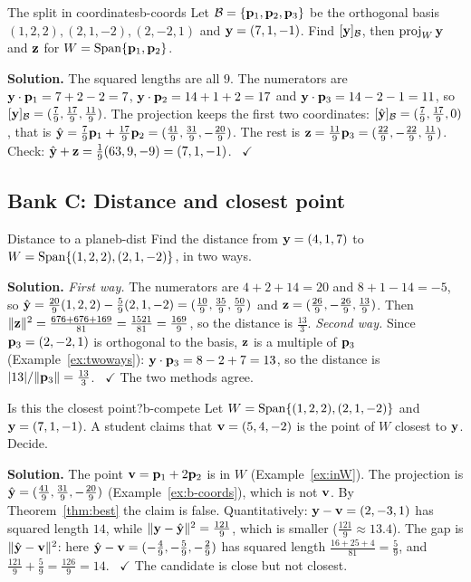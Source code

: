 \documentclass[11pt]{article}
\begin{document}
\begin{exmp}{The split in coordinates}{b-coords}
Let $\mathcal{B}=\{\mathbf{p}_1,\mathbf{p}_2,\mathbf{p}_3\}$ be the orthogonal basis $(1,2,2),(2,1,-2),(2,-2,1)$ and $\mathbf{y}=(7,1,-1)$. Find $[\mathbf{y}]_{\mathcal{B}}$, then $\operatorname{proj}_W\mathbf{y}$ and $\mathbf{z}$ for $W=\operatorname{Span}\{\mathbf{p}_1,\mathbf{p}_2\}$.

\textbf{Solution.} The squared lengths are all $9$. The numerators are $\mathbf{y}\cdot\mathbf{p}_1=7+2-2=7$, $\mathbf{y}\cdot\mathbf{p}_2=14+1+2=17$ and $\mathbf{y}\cdot\mathbf{p}_3=14-2-1=11$, so $[\mathbf{y}]_{\mathcal{B}}=(\tfrac79,\tfrac{17}9,\tfrac{11}9)$. The projection keeps the first two coordinates: $[\hat{\mathbf{y}}]_{\mathcal{B}}=(\tfrac79,\tfrac{17}9,0)$, that is $\hat{\mathbf{y}}=\tfrac79\mathbf{p}_1+\tfrac{17}9\mathbf{p}_2=(\tfrac{41}9,\tfrac{31}9,-\tfrac{20}9)$. The rest is $\mathbf{z}=\tfrac{11}9\mathbf{p}_3=(\tfrac{22}9,-\tfrac{22}9,\tfrac{11}9)$. Check: $\hat{\mathbf{y}}+\mathbf{z}=\tfrac19(63,9,-9)=(7,1,-1)$. \ $\checkmark$
\end{exmp}

\subsection*{Bank C: Distance and closest point}
\begin{exmp}{Distance to a plane}{b-dist}
Find the distance from $\mathbf{y}=(4,1,7)$ to $W=\operatorname{Span}\{(1,2,2),(2,1,-2)\}$, in two ways.

\textbf{Solution.} \emph{First way.} The numerators are $4+2+14=20$ and $8+1-14=-5$, so $\hat{\mathbf{y}}=\tfrac{20}9(1,2,2)-\tfrac59(2,1,-2)=(\tfrac{10}9,\tfrac{35}9,\tfrac{50}9)$ and $\mathbf{z}=(\tfrac{26}9,-\tfrac{26}9,\tfrac{13}9)$. Then $\lVert\mathbf{z}\rVert^2=\tfrac{676+676+169}{81}=\tfrac{1521}{81}=\tfrac{169}9$, so the distance is $\tfrac{13}3$. \emph{Second way.} Since $\mathbf{p}_3=(2,-2,1)$ is orthogonal to the basis, $\mathbf{z}$ is a multiple of $\mathbf{p}_3$ (Example~\ref{ex:twoways}): $\mathbf{y}\cdot\mathbf{p}_3=8-2+7=13$, so the distance is $|13|/\lVert\mathbf{p}_3\rVert=\tfrac{13}3$. \ $\checkmark$ The two methods agree.
\end{exmp}

\begin{exmp}{Is this the closest point?}{b-compete}
Let $W=\operatorname{Span}\{(1,2,2),(2,1,-2)\}$ and $\mathbf{y}=(7,1,-1)$. A student claims that $\mathbf{v}=(5,4,-2)$ is the point of $W$ closest to $\mathbf{y}$. Decide.

\textbf{Solution.} The point $\mathbf{v}=\mathbf{p}_1+2\mathbf{p}_2$ is in $W$ (Example~\ref{ex:inW}). The projection is $\hat{\mathbf{y}}=(\tfrac{41}9,\tfrac{31}9,-\tfrac{20}9)$ (Example~\ref{ex:b-coords}), which is not $\mathbf{v}$. By Theorem~\ref{thm:best} the claim is false. Quantitatively: $\mathbf{y}-\mathbf{v}=(2,-3,1)$ has squared length $14$, while $\lVert\mathbf{y}-\hat{\mathbf{y}}\rVert^2=\tfrac{121}9$, which is smaller ($\tfrac{121}9\approx13.4$). The gap is $\lVert\hat{\mathbf{y}}-\mathbf{v}\rVert^2$: here $\hat{\mathbf{y}}-\mathbf{v}=(-\tfrac49,-\tfrac59,-\tfrac29)$ has squared length $\tfrac{16+25+4}{81}=\tfrac59$, and $\tfrac{121}9+\tfrac59=\tfrac{126}9=14$. \ $\checkmark$ The candidate is close but not closest.
\end{exmp}
\end{document}
